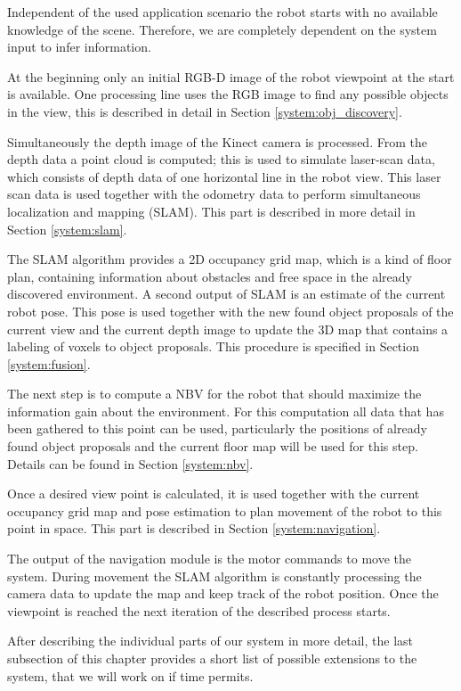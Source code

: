 \documentclass[a4paper,11pt,english]{article}
\begin{document}
Independent of the used application scenario the robot starts with no available knowledge of the scene.
Therefore, we are completely dependent on the system input to infer information.

At the beginning only an initial RGB-D image of the robot viewpoint at the start is available.
One processing line uses the RGB image to find any possible objects in the view, this is described in detail in Section \ref{system:obj_discovery}.

Simultaneously the depth image of the Kinect camera is processed.
From the depth data a point cloud is computed; this is used to simulate laser-scan data, which consists of depth data of one horizontal line in the robot view. 
This laser scan data is used together with the odometry data to perform simultaneous localization and mapping (SLAM).
This part is described in more detail in Section \ref{system:slam}.

The SLAM algorithm provides a 2D occupancy grid map, which is a kind of floor plan, containing information about obstacles and free space in the already discovered environment. A second output of SLAM is an estimate of the current robot pose.
This pose is used together with the new found object proposals of the current view and the current depth image to update the 3D map that contains a labeling of voxels to object proposals. This procedure is specified in Section \ref{system:fusion}. 

The next step is to compute a NBV for the robot that should maximize the information gain about the environment.
For this computation all data that has been gathered to this point can be used, particularly the positions of already found object proposals and the current floor map will be used for this step. Details can be found in Section \ref{system:nbv}.

Once a desired view point is calculated, it is used together with the current occupancy grid map and pose estimation to plan movement of the robot to this point in space.
This part is described in Section \ref{system:navigation}.

The output of the navigation module is the motor commands to move the system.
During movement the SLAM algorithm is constantly processing the camera data to update the map and keep track of the robot position.
Once the viewpoint is reached the next iteration of the described process starts.

After describing the individual parts of our system in more detail, the last subsection of this chapter provides a short list of possible extensions to the system, that we will work on if time permits.
\end{document}
